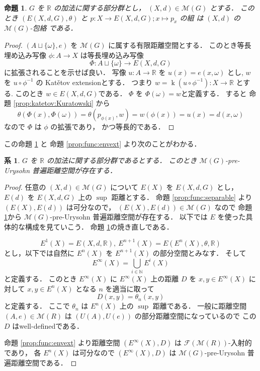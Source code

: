 \documentclass[leqno, 12pt]{jsarticle}
\newtheorem{prop}[thm]{命題}
\newtheorem{cor}[thm]{系}
\newcommand{\nn}{\mathbb{N}}
\newcommand{\rr}{\mathbb{R}}
\DeclareMathOperator{\kat}{k}
\begin{document}
\begin{prop}\label{prop:func:injE}
$G$
を
$\rr$
の加法に関する部分群とし，
$(X, d)\in \mathscr{M}(G)$
とする．
このとき
$(E(X, d, G), \theta)$
と
$p\colon  X\to E(X, d, G); x\mapsto p_{x}$
の組
は
$(X, d)$
の
$\mathscr{M}(G)$-包絡
である．
\end{prop}
\begin{proof}

$(A\sqcup\{ \omega\},e)$
を
$\mathscr{M}(G)$
に属する有限距離空間とする．
このとき等長埋め込み写像
$\phi\colon  A \to X$
は等長埋め込み写像
\[
\Phi\colon A\sqcup \{\omega\}\to E(X, d, G)
\]
に拡張されることを示せば良い．
写像
$u\colon A\to \rr$
を
$u(x)=e(x,\omega)$
とし,
$w$
を
$u\circ \phi^{-1}$
の
Kat\v{e}tov extensionとする．
つまり
$w=\kat(u\circ \phi^{-1})\colon X\to \rr$
とする.
このとき
$w\in E(X, d, G)$である．
$\Phi$
を
$\Phi(\omega)=w$と定義する．
すると
命題 
\ref{prop:katetov:Kuratowski}
から
\[
\theta(\Phi(x), \Phi(\omega))=\theta(p_{\phi(x)}, w)=w(\phi(x))=u(x)=d(x,\omega)
\]
なので
$\Phi$
は
$\phi$
の拡張であり，
かつ等長的である．
\end{proof}

この命題
 \ref{prop:func:injE}
 と
 命題 \ref{prop:func:envext}
 より次のことがわかる．
\begin{cor}\label{cor:func:extG}
$G$
を
$\rr$
の加法に関する部分群であるとする．
このとき
$\mathscr{M}(G)$-pre-Urysohn
普遍距離空間が存在する．
\end{cor}
\begin{proof}
任意の
$(X, d)\in \mathscr{M}(G)$
について
$E(X)$
を
$E(X, d, G)$
とし，
 $E(d)$
 を
 $E(X, d, G)$
 上の
 $\sup$
 距離とする．
命題 
\ref{prop:func:separable}
より
$(E(X), E(d))$
は可分なので，
$(E(X), E(d))\in \mathscr{M}(G)$
なので
命題 
\ref{prop:func:injE}から
$\mathscr{M}(G)$-pre-Urysohn
普遍距離空間が存在する．
以下では
$E$
を使った具体的な構成を見ていこう．
命題 
\ref{prop:func:injE}の焼き直しである．




\[
E^{1}(X)=E(X, d, \rr),\ E^{n+1}(X)=E(E^{n}(X), \theta, \rr)
\]
とし，以下では自然に
$E^{n}(X)$
を
$E^{n+1}(X)$
の部分空間とみなす．
そして
\[
E^{\infty}(X)=\bigcup_{i\in \nn}E^{i}(X)
\]
と定義する．
このとき
$E^{\infty}(X)$
に
$E^{\infty}(X)$
上の距離
$D$
を
$x, y\in E^{\infty}(X)$
に対して
$x, y\in E^{n}(X)$
となる
$n$
を適当に取って
\[
D(x, y)=
\theta_{n}(x, y)
\]
と定義する．
ここで
$\theta_{n}$
は
$E^{n}(X)$
上の
$\sup$
距離である．
一般に距離空間
$(A, e)\in \mathscr{M}(R)$
は
$(U(A), U(e))$
の部分距離空間になっているので
この
$D$
はwell-definedである．




命題 
\ref{prop:func:envext}
より距離空間
$(E^{\infty}(X), D)$
は
$\mathscr{F}(\mathscr{M}(R))$-入射的であり，
各
$E^n(X)$
は可分なので
$(E^{\infty}(X), D)$
は
$\mathscr{M}(G)$-pre-Urysohn
普遍距離空間である．
\end{proof}
\end{document}
